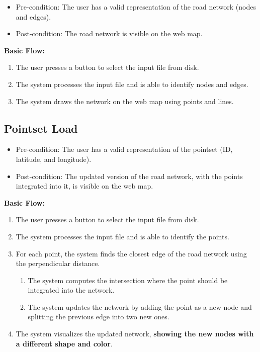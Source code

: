 \documentclass[11pt]{article}
\begin{document}
\begin{itemize}
    \item Pre-condition: The user has a valid representation of the road network (nodes and edges).
    \item Post-condition: The road network is visible on the web map.
\end{itemize}

\textbf{Basic Flow:}
\begin{enumerate}
    \item The user presses a button to select the input file from disk.
    \item The system processes the input file and is able to identify nodes and edges.
    \item The system draws the network on the web map using points and lines.
\end{enumerate}

\subsection{Pointset Load}

\begin{itemize}
    \item Pre-condition: The user has a valid representation of the pointset (ID, latitude, and longitude).
    \item Post-condition: The updated version of the road network, with the points integrated into it, is visible on the web map.
\end{itemize}

\textbf{Basic Flow:}
\begin{enumerate}
    \item The user presses a button to select the input file from disk.
    \item The system processes the input file and is able to identify the points.
    \item For each point, the system finds the closest edge of the road network using the perpendicular distance.
    \begin{enumerate}
        \item The system computes the intersection where the point should be integrated into the network.
        \item The system updates the network by adding the point as a new node and splitting the previous edge into two new ones.
    \end{enumerate}
    \item The system visualizes the updated network, \textbf{showing the new nodes with a different shape and color}.
\end{enumerate}
\end{document}
